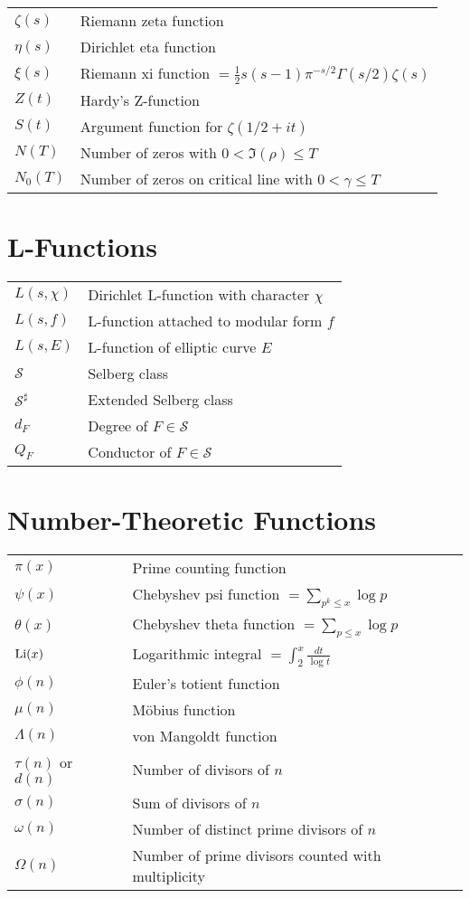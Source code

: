 \begin{tabular}{ll}
$\zeta(s)$ & Riemann zeta function \\
$\eta(s)$ & Dirichlet eta function \\
$\xi(s)$ & Riemann xi function $= \frac{1}{2}s(s-1)\pi^{-s/2}\Gamma(s/2)\zeta(s)$ \\
$Z(t)$ & Hardy's Z-function \\
$S(t)$ & Argument function for $\zeta(1/2 + it)$ \\
$N(T)$ & Number of zeros with $0 < \Im(\rho) \leq T$ \\
$N_0(T)$ & Number of zeros on critical line with $0 < \gamma \leq T$ \\
\end{tabular}

\section{L-Functions}

\begin{tabular}{ll}
$L(s, \chi)$ & Dirichlet L-function with character $\chi$ \\
$L(s, f)$ & L-function attached to modular form $f$ \\
$L(s, E)$ & L-function of elliptic curve $E$ \\
$\mathcal{S}$ & Selberg class \\
$\mathcal{S}^{\sharp}$ & Extended Selberg class \\
$d_F$ & Degree of $F \in \mathcal{S}$ \\
$Q_F$ & Conductor of $F \in \mathcal{S}$ \\
\end{tabular}

\section{Number-Theoretic Functions}

\begin{tabular}{ll}
$\pi(x)$ & Prime counting function \\
$\psi(x)$ & Chebyshev psi function $= \sum_{p^k \leq x} \log p$ \\
$\theta(x)$ & Chebyshev theta function $= \sum_{p \leq x} \log p$ \\
$\operatorname{Li}(x)$ & Logarithmic integral $= \int_2^x \frac{dt}{\log t}$ \\
$\phi(n)$ & Euler's totient function \\
$\mu(n)$ & Möbius function \\
$\Lambda(n)$ & von Mangoldt function \\
$\tau(n)$ or $d(n)$ & Number of divisors of $n$ \\
$\sigma(n)$ & Sum of divisors of $n$ \\
$\omega(n)$ & Number of distinct prime divisors of $n$ \\
$\Omega(n)$ & Number of prime divisors counted with multiplicity \\
\end{tabular}

